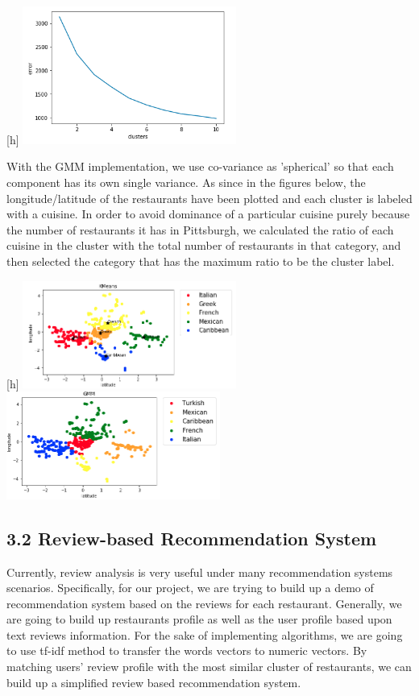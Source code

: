 \documentclass{neu_handout}
\begin{document}
\begin{center}[h]
\includegraphics[width=70mm,scale=0.5]{kmeanserror}
\end{center}

With the GMM implementation, we use co-variance as 'spherical' so that each component has its own single variance. As since in the figures below, the longitude/latitude of the restaurants have been plotted and each cluster is labeled with a cuisine. In order to avoid dominance of a particular cuisine purely because the number of restaurants it has in Pittsburgh, we calculated the ratio of each cuisine in the cluster with the total number of restaurants in that category, and then selected the category that has the maximum ratio to be the cluster label.

\begin{center}[h]
	\includegraphics[width=70mm,scale=0.5]{kmeans}
	\includegraphics[width=70mm,scale=0.5]{gmm}
\end{center}

\subsection*{3.2 Review-based Recommendation System}
Currently, review analysis is very useful under many recommendation systems scenarios. Specifically, for our project, we are trying to build up a demo of recommendation system based on the reviews for each restaurant. Generally, we are going to build up restaurants profile as well as the user profile based upon text reviews information. For the sake of implementing algorithms, we are going to use tf-idf method to transfer the words vectors to numeric vectors. By matching users’ review profile with the most similar cluster of restaurants, we can build up a simplified review based recommendation system.
\end{document}
